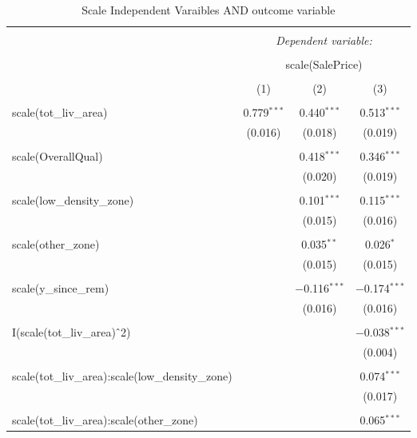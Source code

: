 \documentclass{article}
\begin{document}
\begin{table}[!htbp] \centering 
  \caption{Scale Independent Varaibles AND outcome variable} 
  \label{Scale Independent Varaibles AND outcome variable} 
\begin{tabular}{@{\extracolsep{5pt}}lccc} 
\\[-1.8ex]\hline 
\hline \\[-1.8ex] 
 & \multicolumn{3}{c}{\textit{Dependent variable:}} \\ 
\cline{2-4} 
\\[-1.8ex] & \multicolumn{3}{c}{scale(SalePrice)} \\ 
\\[-1.8ex] & (1) & (2) & (3)\\ 
\hline \\[-1.8ex] 
 scale(tot\_liv\_area) & 0.779$^{***}$ & 0.440$^{***}$ & 0.513$^{***}$ \\ 
  & (0.016) & (0.018) & (0.019) \\ 
  & & & \\ 
 scale(OverallQual) &  & 0.418$^{***}$ & 0.346$^{***}$ \\ 
  &  & (0.020) & (0.019) \\ 
  & & & \\ 
 scale(low\_density\_zone) &  & 0.101$^{***}$ & 0.115$^{***}$ \\ 
  &  & (0.015) & (0.016) \\ 
  & & & \\ 
 scale(other\_zone) &  & 0.035$^{**}$ & 0.026$^{*}$ \\ 
  &  & (0.015) & (0.015) \\ 
  & & & \\ 
 scale(y\_since\_rem) &  & $-$0.116$^{***}$ & $-$0.174$^{***}$ \\ 
  &  & (0.016) & (0.016) \\ 
  & & & \\ 
 I(scale(tot\_liv\_area)$\hat{\mkern6mu}$2) &  &  & $-$0.038$^{***}$ \\ 
  &  &  & (0.004) \\ 
  & & & \\ 
 scale(tot\_liv\_area):scale(low\_density\_zone) &  &  & 0.074$^{***}$ \\ 
  &  &  & (0.017) \\ 
  & & & \\ 
 scale(tot\_liv\_area):scale(other\_zone) &  &  & 0.065$^{***}$ \\ 

\end{tabular}
\end{table}
\end{document}
